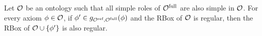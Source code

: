 \documentclass[
]{ceurart}
\begin{document}
\begin{lemma} \label{lem:regularity}
  Let $\mathcal{O}$ be an ontology such that all simple roles of ${\mathcal{O}^\textnormal{full}}$ are also simple in $\mathcal{O}$. For every axiom $\phi \in \mathcal{O}$, if $\phi' \in g_{{\mathcal{O}^\textnormal{ref}},{\mathcal{O}^\textnormal{full}}}(\phi)$ and the RBox of $\mathcal{O}$ is regular, then the RBox of $\mathcal{O} \cup \{ \phi' \}$ is also regular.
\end{lemma}


\end{document}
